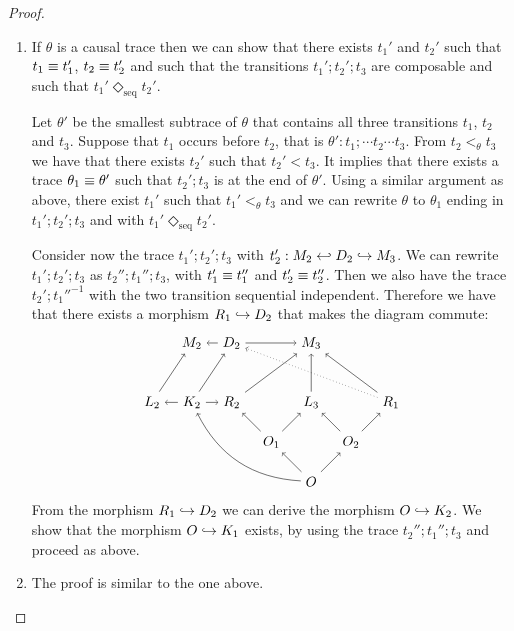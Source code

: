 \begin{proof}
  \begin{enumerate}
  \item If $\theta$ is a causal trace then we can show that there exists $t_1'$ and $t_2'$ such that $t_1\equiv t_1'$, $t_2\equiv t_2'$ and such that the transitions $t_1';t_2';t_3$ are composable and such that $t_1'\Diamond_{\text{seq}} t_2'$.

    Let $\theta'$ be the smallest subtrace of $\theta$ that contains all three transitions $t_1$, $t_2$ and $t_3$. Suppose that $t_1$ occurs before $t_2$, that is $\theta':t_1;\cdots t_2\cdots t_3$.
    From $t_2<_{\theta} t_3$ we have that there exists $t_2'$ such that $t_2'< t_3$. It implies that there exists a trace $\theta_1\equiv\theta'$ such that $t_2';t_3$ is at the end of $\theta'$.
    Using a similar argument as above, there exist $t_1'$ such that $t_1'<_{\theta} t_3$ and we can rewrite $\theta$ to $\theta_1$ ending in $t_1';t_2';t_3$ and with $t_1'\Diamond_{\text{seq}} t_2'$.

    Consider now the trace $t_1';t_2';t_3$ with $t_2':M_2\hookleftarrow D_2 \hookrightarrow M_3$. We can rewrite $t_1';t_2';t_3$ as $t_2'';t_1'';t_3$, with $t_1'\equiv t_1''$ and $t_2'\equiv t_2''$. Then we also have the trace $t_2';t_1''^{-1}$ with the two transition sequential independent. Therefore we have that there exists a morphism $R_1\hookrightarrow D_2$ that makes the diagram commute:
    \[
    \begin{tikzpicture} %
      \node (o) at (0,-1) {\(O\)};
      \node (r3) at (0,1) {\(L_3\)};
      \node (o1) at (-1,0) {\(O_1\)};
      \node (o2) at (1,0) {\(O_2\)};
      \node (r1) at (-2,1) {\(R_2\)};
      \node (r2) at (2,1) {\(R_1\)};
      \node (k1) at (-3,1) {\(K_2\)};
      \node (l1) at (-4,1) {\(L_2\)};
      \node (m3) at (0,2.5) {\(M_3\)};
      \node (d2) at (-2,2.5) {\(D_2\)};
      \node (m2) at (-3,2.5) {\(M_2\)};
      \draw [->] (o) -- (o1);
      \draw [->] (o) -- (o2);
      \draw [->] (o1) -- (r3);
      \draw [->] (o2) -- (r3);
      \draw [->] (o1) -- (r1);
      \draw [->] (o2) -- (r2);
      \draw [->] (k1) -- (r1);
      \draw [->] (o) to [bend left] (k1);
      \draw [->] (k1) -- (l1);
      \draw [->] (d2) -- (m2);
      \draw [->] (d2) -- (m3);
      \draw [->] (k1) -- (d2);
      \draw [->] (l1) -- (m2);
      \draw [->] (r1) -- (m3);
      \draw [->] (r3) -- (m3);
      \draw [->] (r2) -- (m3);
      \draw [dotted,->] (r2) -- (d2);
    \end{tikzpicture}
    \]
    From the morphism $R_1\hookrightarrow D_2$ we can derive the morphism $O\hookrightarrow K_2$. We show that the morphism $O\hookrightarrow K_1$ exists, by using the trace $t_2'';t_1'';t_3$ and proceed as above.
    \item The proof is similar to the one above.
  \end{enumerate}
\end{proof}

